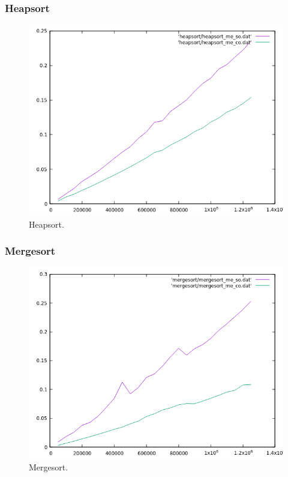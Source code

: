 \documentclass[a4paper,12pt,twoside]{article} %
\begin{document}
\newpage
  
  	\subsubsection{Heapsort}
  	
\begin{figure}[h]
  \begin{center}
  
  	\includegraphics[scale=0.8]{comparacion_hh.png}
  	\caption{Heapsort.}
  	
  \end{center}
\end{figure}

\newpage

	\subsubsection{Mergesort}

\begin{figure}[h]
  \begin{center}
  
  	\includegraphics[scale=0.8]{comparacion_mm.png}
  	\caption{Mergesort.}
  	
  \end{center}
\end{figure}
\end{document}
